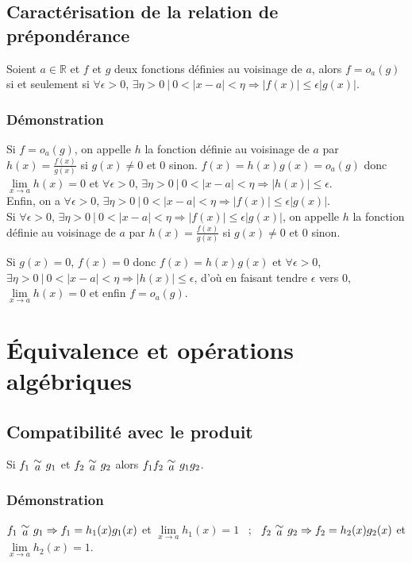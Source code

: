 \documentclass[a4paper,10pt]{book} %
\newcommand{\R}{\mathbb{R}}
\newcommand{\equi}[1]{\renewcommand{\arraystretch}{0.3}~\begin{matrix}\sim\\#1\end{matrix}~\renewcommand{\arraystretch}{1}}
\newcommand{\abs}[1]{\left|#1\right|}
\newcommand{\tq}{~|~}
\begin{document}
\subsection*{Caractérisation de la relation de prépondérance}\label{prop1}
Soient $a \in \R$ et $f$ et $g$ deux fonctions définies au voisinage de $a$, alors $f=o_a(g)$ si et seulement si
$\forall \epsilon>0$, $\exists \eta>0 ~|~ 0<|x-a|<\eta\Rightarrow |f(x)|\leq \epsilon|g(x)|$.

\subsubsection*{Démonstration}
Si $f=o_a(g)$, on appelle $h$ la fonction définie au voisinage de $a$ par $h(x)=\frac{f(x)}{g(x)}$ si $g(x)\neq 0$ et $0$ sinon. $f(x)=h(x)g(x)=o_a(g)$ donc $\lim\limits_{x\rightarrow a}h(x)=0$ et $\forall \epsilon>0$, $\exists \eta>0 \tq 0<\abs{x-a}<\eta \Rightarrow \abs{h(x)}\leq\epsilon$.\\
Enfin, on a $\forall \epsilon>0$, $\exists \eta>0 ~|~ 0<|x-a|<\eta\Rightarrow |f(x)|\leq \epsilon|g(x)|$.\\

Si $\forall \epsilon>0$, $\exists \eta>0 ~|~ 0<|x-a|<\eta\Rightarrow |f(x)|\leq \epsilon|g(x)|$, on appelle $h$ la fonction définie au voisinage de $a$ par $h(x)=\frac{f(x)}{g(x)}$ si $g(x)\neq 0$ et $0$ sinon.

Si $g(x)=0$, $f(x)=0$ donc $f(x)=h(x)g(x)$ et $\forall \epsilon>0$, $\exists \eta>0 ~|~ 0<|x-a|<\eta\Rightarrow |h(x)|\leq \epsilon$, d'où en faisant tendre $\epsilon$ vers 0, $\lim\limits_{x\rightarrow a}h(x)=0$ et enfin $f=o_a(g)$.


\newpage

\section{Équivalence et opérations algébriques}
\subsection{Compatibilité avec le produit}
Si $f_1 \equi{a} g_1$ et $f_2 \equi{a} g_2$ alors $f_1f_2 \equi{a} g_1g_2$.

\subsubsection{Démonstration}
$f_1 \equi{a} g_1 \Rightarrow f_1=h_1(x)g_1(x)$ et $\lim\limits_{x\rightarrow a}h_1(x)=1$ ~;~
$f_2 \equi{a} g_2 \Rightarrow f_2=h_2(x)g_2(x)$ et $\lim\limits_{x\rightarrow a}h_2(x)=1$.
\end{document}
